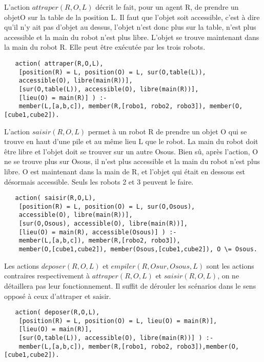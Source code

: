 \documentclass[a4paper,10pt]{article}
\begin{document}
   L'action $attraper(R,O,L)$ d\'{e}crit le fait, pour un agent R, de prendre un objetO sur la table de la position L. Il faut que l'objet soit accessible, c'est \`{a} dire qu'il n'y ait pas d'objet au dessus,
   l'objet n'est donc plus sur la table, n'est plus accessible et la main du robot n'est plus libre. L'objet se trouve maintenant dans la main du robot R.
   Elle peut \^{e}tre ex\'{e}cut\'{e}e par les trois robots.
   
   \begin{lstlisting}
   action( attraper(R,O,L),
	[position(R) = L, position(O) = L, sur(O,table(L)), 
	accessible(O), libre(main(R))],
	[sur(O,table(L)), accessible(O), libre(main(R))],
	[lieu(O) = main(R)] ) :-
	member(L,[a,b,c]), member(R,[robo1, robo2, robo3]), member(O,[cube1,cube2]).
   \end{lstlisting}
   
   L'action $saisir(R,O,L)$ permet \`{a} un robot R de prendre un objet O qui se trouve en haut d'une pile et au m\^{e}me lieu L que le robot.
   La main du robot doit être libre et l'objet doit se trouver sur un autre Osous. Bien s\^{u}, apr\`{e}s l'action, O ne se trouve plus sur Osous,
   il n'est plus accessible et la main du robot n'est plus libre. O est maintenant dans la main de R, et l'objet qui \'{e}tait en dessous est d\'{e}sormais accessible.
   Seuls les robots 2 et 3 peuvent le faire.
   
   \begin{lstlisting}
   action( saisir(R,O,L),
	[position(R) = L, position(O) = L, sur(O,Osous), 
	accessible(O), libre(main(R))],
	[sur(O,Osous), accessible(O), libre(main(R))],
	[lieu(O) = main(R), accessible(Osous)] ) :-
	member(L,[a,b,c]), member(R,[robo2, robo3]), 
	member(O,[cube1,cube2]), member(Osous,[cube1,cube2]), O \= Osous.
   \end{lstlisting}
   
   Les actions $deposer(R,O,L)$ et $empiler(R,Osur,Osous,L)$ sont les actions contraires respectivement à $attraper(R,O,L)$ et $saisir(R,O,L)$, 
   on ne détaillera pas leur fonctionnement. Il suffit de d\'{e}rouler les sc\'{e}narios dans le sens oppos\'{e} \`{a} ceux d'attraper et saisir.
   
   \begin{lstlisting}
   action( deposer(R,O,L),
	[position(R) = L, position(O) = L, lieu(O) = main(R)],
	[lieu(O) = main(R)],
	[sur(O,table(L)), accessible(O), libre(main(R))] ) :-
	member(L,[a,b,c]), member(R,[robo1, robo2, robo3]),member(O,[cube1,cube2]).
   \end{lstlisting}
   
\end{document}
